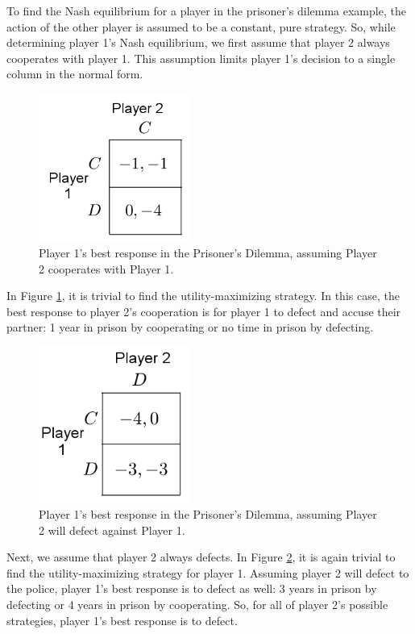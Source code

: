To find the Nash equilibrium for a player in the prisoner's dilemma example, the action of the other player is assumed to be a constant, pure strategy. So, while determining player 1's Nash equilibrium, we first assume that player 2 always cooperates with player 1. This assumption limits player 1's decision to a single column in the normal form.
\begin{figure}[H]
  \centering
  \includegraphics[width=5cm]{figures/ExamplePartialCol1.png}
  \caption{Player 1's best response in the Prisoner's Dilemma, assuming Player 2 cooperates with Player 1.}
  \label{fig:NashCol1}
\end{figure}

In Figure \ref{fig:NashCol1}, it is trivial to find the utility-maximizing strategy. In this case, the best response to player 2's cooperation is for player 1 to defect and accuse their partner: 1 year in prison by cooperating or no time in prison by defecting.\\

\begin{figure}[H]
  \centering
  \includegraphics[width=5cm]{figures/ExamplePartialCol2.png}
  \caption{Player 1's best response in the Prisoner's Dilemma, assuming Player 2 will defect against Player 1.}
  \label{fig:NashCol2}
\end{figure}
Next, we assume that player 2 always defects. In Figure \ref{fig:NashCol2}, it is again trivial to find the utility-maximizing strategy for player 1. Assuming player 2 will defect to the police, player 1's best response is to defect as well: 3 years in prison by defecting or 4 years in prison by cooperating. So, for all of player 2's possible strategies, player 1's best response is to defect.\\

